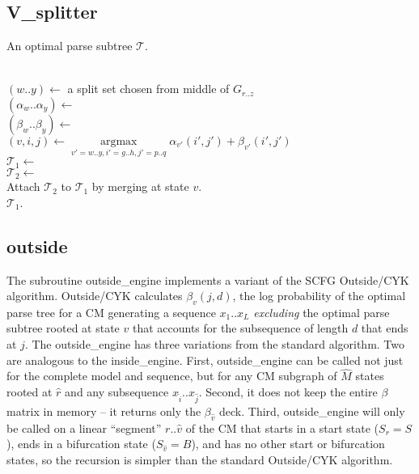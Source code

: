 \documentclass[11pt]{article}
\def\argmax{\mathop{\mathrm{argmax}}\limits}
\begin{document}
\subsection{V\_splitter}
\begin{algorithm}
         {An optimal parse subtree $\mathcal{T}$.}

\begin{algtab}
  \algreturn {}\\
\algelse
  $(w..y) \leftarrow$ a split set chosen from middle of $G_{r..z}$\\
  $(\alpha_w..\alpha_y) \leftarrow$ \\
  $(\beta_w..\beta_y)   \leftarrow$ \\
  $(v,i,j) \leftarrow \argmax_{v'=w..y, i'=g..h, j'=p..q} 
	\alpha_{v'}(i',j') + \beta_{v'}(i',j')$\\
  $\mathcal{T}_1 \leftarrow$ \\
  $\mathcal{T}_2 \leftarrow$ \\
  Attach $\mathcal{T}_2$ to $\mathcal{T}_1$ by merging at state $v$.\\
  \algreturn $\mathcal{T}_1$.\\
\algend
\end{algtab}
\end{algorithm}






\subsection{outside}

The subroutine outside\_engine implements a variant of the SCFG
Outside/CYK algorithm. Outside/CYK calculates $\beta_v(j,d)$, the log
probability of the optimal parse tree for a CM generating a sequence
$x_1..x_L$ \emph{excluding} the optimal parse subtree rooted at state
$v$ that accounts for the subsequence of length $d$ that ends at $j$.
The outside\_engine has three variations from the standard algorithm.
Two are analogous to the inside\_engine. First, outside\_engine can be
called not just for the complete model and sequence, but for any CM
subgraph of $\hat{M}$ states rooted at $\hat{r}$ and any subsequence
$x_{\hat{i}}..x_{\hat{j}}$. Second, it does not keep the entire $\beta$
matrix in memory -- it returns only the $\beta_{\hat{v}}$ deck. Third,
outside\_engine will only be called on a linear ``segment''
$r..\hat{v}$ of the CM that starts in a start state ($S_r = S$), ends
in a bifurcation state ($S_{\hat{v}} = B$), and has no other start or
bifurcation states, so the recursion is simpler than the standard
Outside/CYK algorithm.
\end{document}
